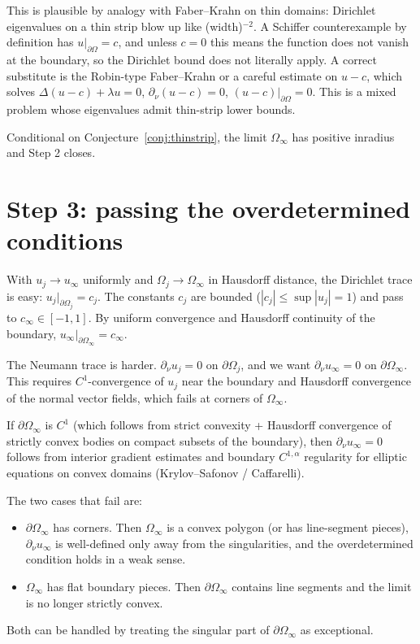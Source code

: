 \documentclass[11pt]{article}
\newcommand{\Om}{\Omega}
\newcommand{\1}{\mathbf 1}
\newcommand{\nor}{\partial_\nu}
\begin{document}
This is plausible by analogy with Faber--Krahn on thin domains:
Dirichlet eigenvalues on a thin strip blow up like (width)$^{-2}$. A
Schiffer counterexample by definition has $u|_{\partial\Om}=c$, and
unless $c=0$ this means the function does not vanish at the boundary,
so the Dirichlet bound does not literally apply. A correct
substitute is the Robin-type Faber--Krahn or a careful estimate on
$u-c$, which solves $\Delta(u-c)+\lambda u=0$, $\nor(u-c)=0$,
$(u-c)|_{\partial\Om}=0$. This is a mixed problem whose eigenvalues
admit thin-strip lower bounds.

Conditional on Conjecture~\ref{conj:thinstrip}, the limit
$\Om_\infty$ has positive inradius and Step 2 closes.

\section{Step 3: passing the overdetermined conditions}

With $u_j\to u_\infty$ uniformly and $\Om_j\to\Om_\infty$ in
Hausdorff distance, the Dirichlet trace is easy:
$u_j|_{\partial\Om_j}=c_j$. The constants $c_j$ are bounded
($|c_j|\le\sup|u_j|=1$) and pass to $c_\infty\in[-1,1]$. By uniform
convergence and Hausdorff continuity of the boundary,
$u_\infty|_{\partial\Om_\infty}=c_\infty$.

The Neumann trace is harder. $\nor u_j=0$ on $\partial\Om_j$, and we
want $\nor u_\infty=0$ on $\partial\Om_\infty$. This requires
$C^1$-convergence of $u_j$ near the boundary and Hausdorff
convergence of the normal vector fields, which fails at corners of
$\Om_\infty$.

If $\partial\Om_\infty$ is $C^1$ (which follows from strict convexity
+ Hausdorff convergence of strictly convex bodies on compact subsets
of the boundary), then $\nor u_\infty=0$ follows from interior
gradient estimates and boundary $C^{1,\alpha}$ regularity for elliptic
equations on convex domains (Krylov--Safonov / Caffarelli).

The two cases that fail are:
\begin{itemize}[leftmargin=*]
    \item $\partial\Om_\infty$ has corners. Then $\Om_\infty$ is a
    convex polygon (or has line-segment pieces), $\nor u_\infty$ is
    well-defined only away from the singularities, and the
    overdetermined condition holds in a weak sense.
    \item $\Om_\infty$ has flat boundary pieces. Then $\partial\Om_\infty$
    contains line segments and the limit is no longer strictly
    convex.
\end{itemize}
Both can be handled by treating the singular part of $\partial\Om_\infty$
as exceptional.
\end{document}

